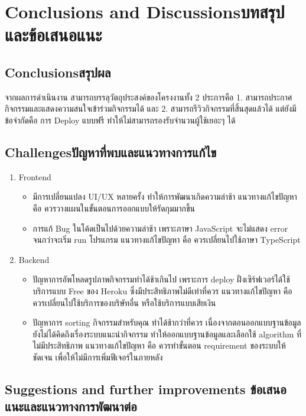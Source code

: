 \chapter{\ifenglish Conclusions and Discussions\else บทสรุปและข้อเสนอแนะ\fi}

\section{\ifenglish Conclusions\else สรุปผล\fi}

จากผลการดำเนินงาน สามารถบรรลุวัตถุประสงค์ของโครงงานทั้ง 2 ประการคือ 1. สามารถประกาศกิจกรรมและแสดงความสนใจเข้าร่วมกิจกรรมได้ และ
2. สามารถรีวิวกิจกรรมที่สิ้นสุดแล้วได้ แต่ยังมีข้อจำกัดคือ การ Deploy แบบฟรี ทำให้ไม่สามารถรองรับจำนวนผู้ใช้เยอะๆ ได้

\section{\ifenglish Challenges\else ปัญหาที่พบและแนวทางการแก้ไข\fi}

\begin{enumerate}
    \item Frontend
    \begin{itemize}
        \item มีการเปลี่ยนแปลง UI/UX หลายครั้ง ทำให้การพัฒนาเกิดความล่าช้า แนวทางแก้ไขปัญหา คือ ควรวางแผนในขั้นตอนการออกแบบให้รัดกุมมากขึ้น
        \item การแก้ Bug ในโค้ดเป็นไปด้วยความล่าช้า เพราะภาษา JavaScript จะไม่แสดง error จนกว่าจะเริ่ม run โปรแกรม แนวทางแก้ไขปัญหา คือ ควรเปลี่ยนไปใช้ภาษา TypeScript
    \end{itemize}
    \item Backend
    \begin{itemize}
        \item ปัญหาการอัพโหลดรูปภาพกิจกรรมทำได้ช้าเกินไป เพราะการ deploy ฝั่งเซิร์ฟเวอร์ได้ใช้บริการแบบ Free ของ Heroku ซึ่งมีประสิทธิภาพไม่ดีเท่าที่ควร แนวทางแก้ไขปัญหา คือ ควรเปลี่ยนไปใช้บริการของบริษัทอื่น หรือใช้บริการแบบเสียเงิน
        \item ปัญหาการ sorting กิจกรรมสำหรับคุณ ทำได้ช้ากว่าที่ควร เนื่องจากตอนออกแบบฐานข้อมูล ยังไม่ได้คิดถึงเรื่องระบบแนะนำกิจกรรม ทำให้ออกแบบฐานข้อมูลและเลือกใช้ algorithm ที่ไม่มีประสิทธิภาพ แนวทางแก้ไขปัญหา คือ ควรทำขั้นตอน requirement ของระบบให้ชัดเจน เพื่อให้ไม่มีการเพิ่มฟีเจอร์ในภายหลัง
    \end{itemize}
\end{enumerate}

\section{\ifenglish%
Suggestions and further improvements
\else%
ข้อเสนอแนะและแนวทางการพัฒนาต่อ
\fi
}

